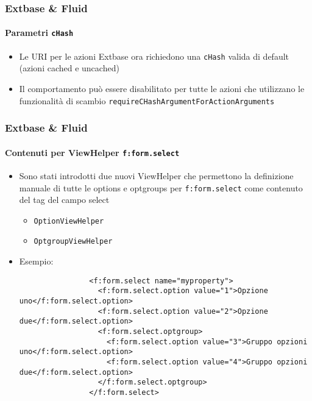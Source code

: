 \begin{frame}[fragile]
	\frametitle{Extbase \& Fluid}
	\framesubtitle{Parametri \texttt{cHash}}

	\begin{itemize}
		\item Le URI per le azioni Extbase ora richiedono una \texttt{cHash} valida di default\newline
			(azioni cached e uncached)
		\item Il comportamento può essere disabilitato per tutte le azioni che utilizzano le funzionalità di scambio
			\texttt{requireCHashArgumentForActionArguments}
	\end{itemize}

\end{frame}

\begin{frame}[fragile]
	\frametitle{Extbase \& Fluid}
	\framesubtitle{Contenuti per ViewHelper \texttt{f:form.select}}

	\lstset{basicstyle=\tiny\ttfamily}

	\begin{itemize}
		\item Sono stati introdotti due nuovi ViewHelper che permettono la definizione manuale di tutte le options e
		    optgroups per \texttt{f:form.select} come contenuto del tag del campo select

			\begin{itemize}
				\item \texttt{OptionViewHelper}
				\item \texttt{OptgroupViewHelper}
			\end{itemize}

		\item Esempio:

			\begin{lstlisting}
				<f:form.select name="myproperty">
				  <f:form.select.option value="1">Opzione uno</f:form.select.option>
				  <f:form.select.option value="2">Opzione due</f:form.select.option>
				  <f:form.select.optgroup>
				    <f:form.select.option value="3">Gruppo opzioni uno</f:form.select.option>
				    <f:form.select.option value="4">Gruppo opzioni due</f:form.select.option>
				  </f:form.select.optgroup>
				</f:form.select>
			\end{lstlisting}

		\end{itemize}

\end{frame}


